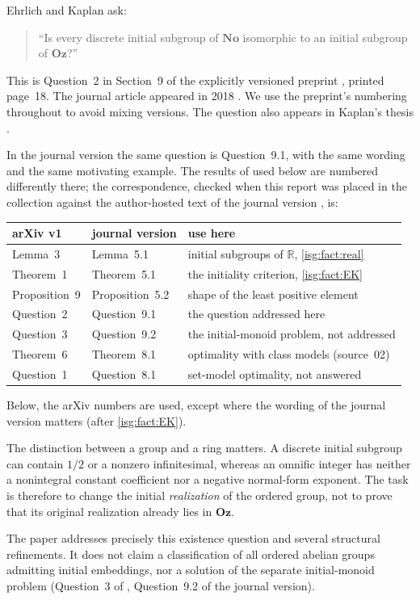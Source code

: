 \documentclass[11pt]{article}
\theoremstyle{definition}
\theoremstyle{remark}
\newcommand{\No}{\ensuremath{\mathbf{No}}}
\newcommand{\Oz}{\ensuremath{\mathbf{Oz}}}
\newcommand{\R}{\mathbb{R}}
\begin{document}
Ehrlich and Kaplan ask:
\begin{quote}
``Is every discrete initial subgroup of $\No$ isomorphic to an initial
subgroup of $\Oz$?''
\end{quote}
This is Question~2 in Section~9 of the explicitly versioned preprint
\cite{EK}, printed page~18. The journal article appeared in 2018
\cite{EKjournal}. We use the preprint's numbering throughout to avoid
mixing versions. The question also appears in Kaplan's thesis
\cite{Kaplan}.

In the journal version the same question is Question~9.1, with the same
wording and the same motivating example. The results of \cite{EK} used
below are numbered differently there; the correspondence, checked when
this report was placed in the collection against the author-hosted text
of the journal version \cite{EKjournal}, is:
\begin{center}\small
\begin{tabular}{@{}lll@{}}
\toprule
arXiv v1 \cite{EK} & journal version \cite{EKjournal} & use here\\
\midrule
Lemma~3 & Lemma~5.1 & initial subgroups of $\R$, \cref{isg:fact:real}\\
Theorem~1 & Theorem~5.1 & the initiality criterion, \cref{isg:fact:EK}\\
Proposition~9 & Proposition~5.2 & shape of the least positive element\\
Question~2 & Question~9.1 & the question addressed here\\
Question~3 & Question~9.2 & the initial-monoid problem, not addressed\\
Theorem~6 & Theorem~8.1 & optimality with class models (source~02)\\
Question~1 & Question~8.1 & set-model optimality, not answered\\
\bottomrule
\end{tabular}
\end{center}
Below, the arXiv numbers are used, except where the wording of the
journal version matters (after \cref{isg:fact:EK}).

The distinction between a group and a ring matters. A discrete initial
subgroup can contain $1/2$ or a nonzero infinitesimal, whereas an omnific
integer has neither a nonintegral constant coefficient nor a negative
normal-form exponent. The task is therefore to change the initial
\emph{realization} of the ordered group, not to prove that its original
realization already lies in $\Oz$.

The paper addresses precisely this existence question and several
structural refinements. It does not claim a classification of all ordered
abelian groups admitting initial embeddings, nor a solution of the
separate initial-monoid problem (Question~3 of \cite{EK}, Question~9.2
of the journal version).
\end{document}
